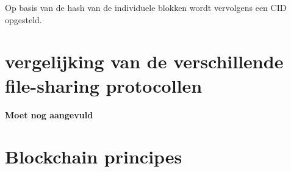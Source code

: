 Op basis van de hash van de individuele blokken wordt vervolgens een CID opgesteld.  

\section{vergelijking van de verschillende file-sharing protocollen}
\label{vergelijking-FS}
\textbf{Moet nog aangevuld}

\section{Blockchain principes}
